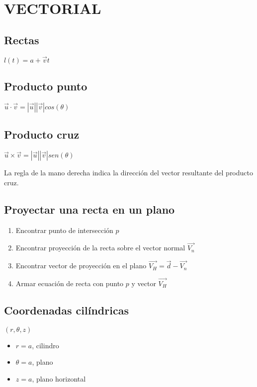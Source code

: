 \section{VECTORIAL}

\subsection{Rectas}

$l(t)=a+\overrightarrow{v}t$
\subsection{Producto punto}
$\overrightarrow{u}\cdot\overrightarrow{v}=|\overrightarrow{u}||\overrightarrow{v}|cos(\theta)$

\subsection{Producto cruz}
$\overrightarrow{u}\times\overrightarrow{v}=|\overrightarrow{u}||\overrightarrow{v}|sen(\theta)$

La regla de la mano derecha indica la dirección del vector resultante del producto cruz.

\subsection{Proyectar una recta en un plano}
\begin{enumerate}
	\item Encontrar punto de intersección $p$
	\item Encontrar proyección de la recta sobre el vector normal $\overrightarrow{V_n}$
	\item Encontrar vector de proyección en el plano $\overrightarrow{V_H}=\overrightarrow{d}-\overrightarrow{V_n}$
	\item Armar ecuación de recta con punto $p$ y vector $\overrightarrow{V_H}$
\end{enumerate}
\subsection{Coordenadas cilíndricas}

$(r, \theta, z)$

\begin{itemize}
	\item $r=a$, cilindro
	\item $\theta=a$, plano
	\item $z=a$, plano horizontal
\end{itemize}

